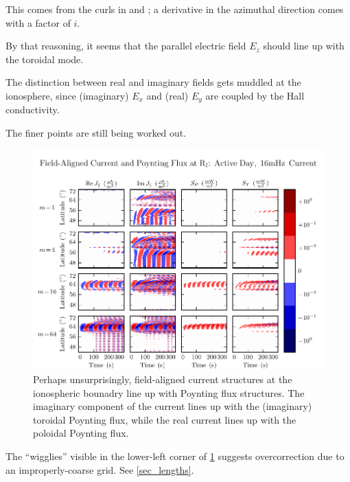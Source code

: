 This comes from the curls in \farlaw and \amplaw; a derivative in the azimuthal direction comes with a factor of $i$. 

By that reasoning, it seems that the parallel electric field $E_z$ should line up with the toroidal mode. 

The distinction between real and imaginary fields gets muddled at the ionosphere, since (imaginary) $E_x$ and (real) $E_y$ are coupled by the Hall conductivity. 

The finer points are still being worked out. 

\begin{figure}[H]
    \centering
    \includegraphics[width=\textwidth]{figures/JS_1_016mHz.pdf}
    \caption[Field-Aligned Current and Poynting Flux at the Ionosphere]{
      Perhaps unsurprisingly, field-aligned current structures at the ionospheric bounadry line up with Poynting flux structures. The imaginary component of the current lines up with the (imaginary) toroidal Poynting flux, while the real current lines up with the poloidal Poynting flux. 
    }
    \label{fig_JS_1_016mHz}
\end{figure}


The ``wigglies'' visible in the lower-left corner of \cref{fig_JS_1_016mHz} suggests overcorrection due to an improperly-coarse grid. See \cref{sec_lengths}. 


